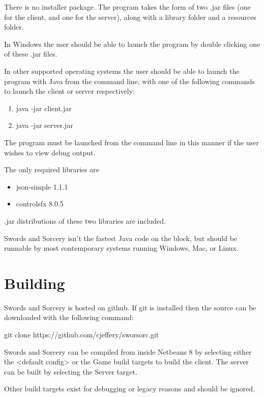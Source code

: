 \documentclass[12pt,a4paper]{article}
\begin{document}
There is no installer package. The program takes the form of two .jar files
(one for the client, and one for the server), along with a library folder and a 
resources folder.

In Windows the user should be
able to launch the program by double clicking one of these .jar files. 

In other supported operating systems the user should be able to launch the
program with Java from the command line, with one of the following commands to
launch the client or server respectively:

\begin{enumerate}
\item{java -jar client.jar}
\item{java -jar server.jar}
\end{enumerate}

The program must be launched from the command line in this manner if the user
wishes to view debug output.

The only required libraries are

\begin{itemize}
	\item json-simple 1.1.1
	\item controlsfx 8.0.5
\end{itemize}

.jar distributions of these two libraries are included.

Swords and Sorcery isn't the fastest Java code on the block, but should be
runnable by most contemporary systems running Windows, Mac, or Linux.

\section{Building}
Swords and Sorcery is hosted on github. If git is installed then the source can
be downloaded with the following command:

    git clone https://github.com/cjeffery/sworsorc.git

Swords and Sorcery can be compiled from inside Netbeans 8 by selecting either
the <default config> or the Game build targets to build the client. The server
can be built by selecting the Server target.

Other build targets exist for debugging or legacy reasons and should be ignored.
\end{document}

